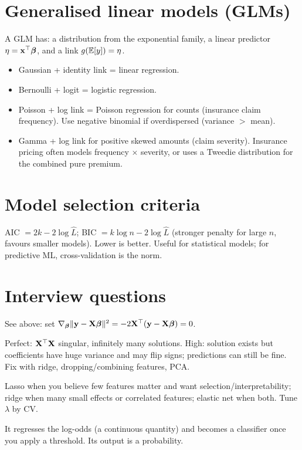 \section{Generalised linear models (GLMs)}
A GLM has: a distribution from the exponential family, a linear predictor $\eta=\mathbf{x}^\top\bm{\beta}$, and a link $g(\mathbb{E}[y])=\eta$.
\begin{itemize}
  \item Gaussian + identity link = linear regression.
  \item Bernoulli + logit = logistic regression.
  \item Poisson + log link = Poisson regression for counts (insurance claim frequency). Use negative binomial if overdispersed (variance $>$ mean).
  \item Gamma + log link for positive skewed amounts (claim severity). Insurance pricing often models frequency $\times$ severity, or uses a Tweedie distribution for the combined pure premium.
\end{itemize}

\section{Model selection criteria}
AIC $=2k-2\log\hat L$; BIC $=k\log n-2\log\hat L$ (stronger penalty for large $n$, favours smaller models). Lower is better. Useful for statistical models; for predictive ML, cross-validation is the norm.

\section{Interview questions}
\A See above: set $\nabla_{\bm{\beta}}\|\mathbf{y}-\mathbf{X}\bm{\beta}\|^2=-2\mathbf{X}^\top(\mathbf{y}-\mathbf{X}\bm{\beta})=0$.

\A Perfect: $\mathbf{X}^\top\mathbf{X}$ singular, infinitely many solutions. High: solution exists but coefficients have huge variance and may flip signs; predictions can still be fine. Fix with ridge, dropping/combining features, PCA.

\A Lasso when you believe few features matter and want selection/interpretability; ridge when many small effects or correlated features; elastic net when both. Tune $\lambda$ by CV.

\A It regresses the log-odds (a continuous quantity) and becomes a classifier once you apply a threshold. Its output is a probability.

